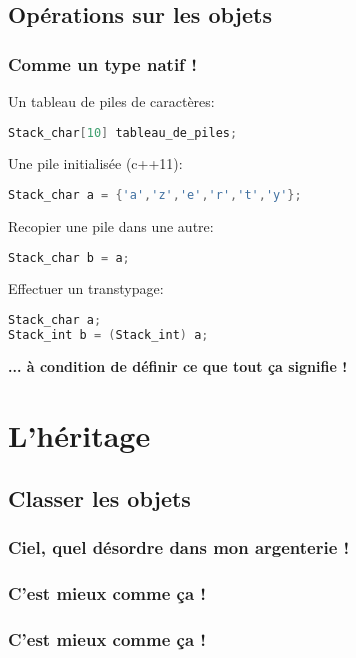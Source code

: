\documentclass{beamer}
\begin{document}
\subsection {Opérations sur les objets}

\begin{frame}[fragile=singleslide,shrink=20]
\frametitle{Comme un type natif !}
Un tableau de piles de caractères:
\begin{lstlisting}[language=c++]
Stack_char[10] tableau_de_piles;
\end{lstlisting}
Une pile initialisée (c++11):
\begin{lstlisting}[language=c++]
Stack_char a = {'a','z','e','r','t','y'};
\end{lstlisting}
Recopier une pile dans une autre:
\begin{lstlisting}[language=c++]
Stack_char b = a;
\end{lstlisting}
Effectuer un transtypage:
\begin{lstlisting}[language=c++]
Stack_char a;
Stack_int b = (Stack_int) a;
\end{lstlisting}
\textbf{... à condition de définir ce que tout ça signifie !}
\end{frame}

\section{L'héritage}
\subsection {Classer les objets}

\begin{frame}
\frametitle{Ciel, quel désordre dans mon argenterie !}
\begin{centering}%
%
\par%
\end{centering}%
\end{frame}

\begin{frame}
\frametitle{C'est mieux comme ça !}
\begin{centering}
%
\par%
\end{centering}%
\end{frame}

\begin{frame}
\frametitle{C'est mieux comme ça !}
\begin{centering}
%
\par%
\end{centering}%
\end{frame}
\end{document}

